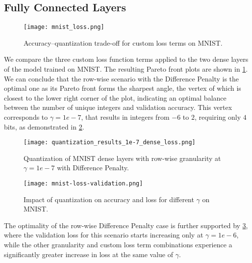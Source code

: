 

\subsection{Fully Connected Layers}
\label{subsec:fullyconnectedlayerscustomloss}

\begin{figure}[t!]
  \centering
  \texttt{[image: mnist\_loss.png]}
  \caption{Accuracy–quantization trade-off for custom loss terms on MNIST.}
  \label{fig:mnist-loss}
\end{figure}

\hspace*{1em}We compare the three custom loss function terms applied 
to the two dense layers of the model trained on MNIST. 
The resulting Pareto front plots are shown in \cref{fig:mnist-loss}.
We can conclude that the row-wise scenario with the Difference Penalty is the optimal one
as its Pareto front forms the sharpest angle,
the vertex of which is closest to the lower right corner of the plot, indicating an optimal
balance between the number of unique integers and validation accuracy. 
This vertex corresponds to \( \gamma = 1e-7\), that results in integers  
from \(-6 \) to \(2 \),
requiring only \( 4 \) bits, as demonstrated in \cref{fig:quantization_results_1e-7_dense_loss}.

\begin{figure}[t!]
  \centering
  \texttt{[image: quantization\_results\_1e-7\_dense\_loss.png]}
  \caption{Quantization of MNIST dense layers with row-wise granularity at \( \gamma  = 1e-7 \) with Difference Penalty.}
  \label{fig:quantization_results_1e-7_dense_loss}
\end{figure}

\begin{figure}[t!]
  \centering
  \texttt{[image: mnist-loss-validation.png]}
  \caption{Impact of quantization on accuracy and loss for different \( \gamma \) on MNIST.}
  \label{fig:mnist-loss-validation}
\end{figure}

The optimality of the row-wise Difference Penalty case is further supported 
by \cref{fig:mnist-loss-validation}, 
where the validation loss for this scenario starts increasing only at
\( \gamma = 1e-6\), 
while the other granularity and custom loss term combinations
experience a significantly greater increase in loss at the same value of
\( \gamma \). 

